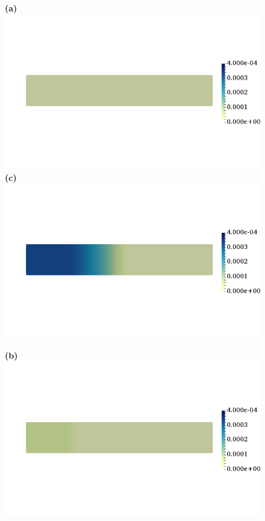 \documentclass[12pt,a4paper]{article}
\begin{document}
\begin{figure}
\begin{minipage}{0.47\textwidth}
 \textbf{(a)} \includegraphics[trim=0cm 4cm 0cm 4cm, clip=true, width=0.9\linewidth]{c5}
      \textbf{(c)} \includegraphics[trim=0cm 4cm 0cm 4cm, clip=true, width=0.9\linewidth]{c100}
    \end{minipage}
    \begin{minipage}{0.47\textwidth}
  \textbf{(b)} \includegraphics[trim=0cm 4cm 0cm 4cm, clip=true, width=0.9\linewidth]{c15}

\end{minipage}
\end{figure}
\end{document}
